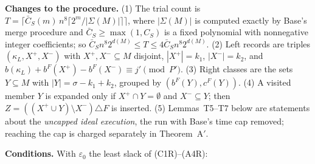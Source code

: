 \documentclass[11pt]{article}
\newcommand{\eps}{\varepsilon}
\theoremstyle{plain}
\begin{document}
\textbf{Changes to the procedure.} (1) The trial count is $T = \lceil \bar C_S(m)\, n^8 \lceil 2^m/|\Sigma(M)| \rceil \rceil$, where $|\Sigma(M)|$ is computed exactly by Base's merge procedure and $\bar C_S \ge \max(1, C_S)$ is a fixed polynomial with nonnegative integer coefficients; so $\bar C_S n^8 2^{d(M)} \le T \le 4\bar C_S n^8 2^{d(M)}$. (2) Left records are triples $(\kappa_L, X^+, X^-)$ with $X^+, X^- \subseteq M$ disjoint, $|X^+| = k_1$, $|X^-| = k_2$, and $b(\kappa_L) + b^F(X^+) - b^F(X^-) \equiv j' \pmod{P'}$. (3) Right classes are the sets $Y \subseteq M$ with $|Y| = \sigma - k_1 + k_2$, grouped by $(b^F(Y), c^F(Y))$. (4) A visited member $Y$ is expanded only if $X^+ \cap Y = \emptyset$ and $X^- \subseteq Y$; then $Z = ((X^+ \cup Y)\setminus X^-) \triangle F$ is inserted. (5) Lemmas~T5--T7 below are statements about the \emph{uncapped ideal execution}, the run with Base's time cap removed; reaching the cap is charged separately in Theorem~A$'$.

\textbf{Conditions.} With $\eps_0$ the least slack of (C1R)--(A4R):
\end{document}
